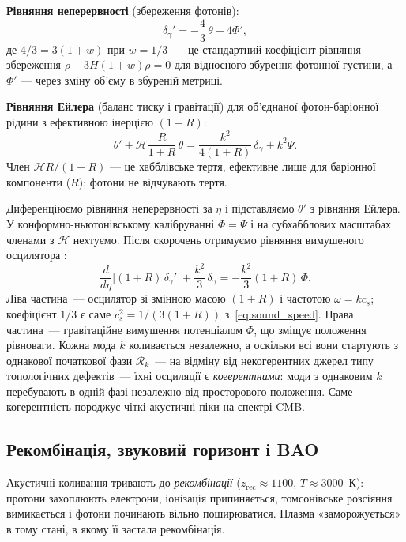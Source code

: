\documentclass[12pt, a4paper]{article}
\begin{document}
\textbf{Рівняння неперервності} (збереження фотонів):
\begin{equation*}
  \delta_\gamma' = -\frac{4}{3}\,\theta + 4\Phi',
\end{equation*}
де $4/3 = 3(1+w)$ при $w=1/3$~--- це стандартний коефіцієнт
рівняння збереження $\dot\rho + 3H(1+w)\rho = 0$ для відносного
збурення фотонної густини,
а $\Phi'$ — через зміну об'єму в збуреній метриці.

\textbf{Рівняння Ейлера} (баланс тиску і гравітації) для
об'єднаної фотон-баріонної рідини з ефективною інерцією $(1+R)$:
\begin{equation*}
  \theta' + \mathcal{H}\frac{R}{1+R}\,\theta
  = \frac{k^2}{4(1+R)}\,\delta_\gamma + k^2\Psi.
\end{equation*}
Член $\mathcal{H}R/(1+R)$ — це хабблівське тертя, ефективне
лише для баріонної компоненти ($R$); фотони не відчувають тертя.

Диференціюємо рівняння неперервності за $\eta$ і підставляємо
$\theta'$ з рівняння Ейлера. У конформно-ньютонівському
калібруванні $\Phi = \Psi$ і на субхабблових масштабах
членами з $\mathcal{H}$ нехтуємо. Після скорочень отримуємо
рівняння вимушеного осцилятора \cite{dodelson_2020}:
\begin{equation}\label{eq:acoustic_oscillator}
  \frac{d}{d\eta}\bigl[(1+R)\,\delta_\gamma'\bigr]
  + \frac{k^2}{3}\,\delta_\gamma
  = -\frac{k^2}{3}(1+R)\,\Phi.
\end{equation}
Ліва частина~--- осцилятор зі змінною масою $(1+R)$
і частотою $\omega = kc_s$; коефіцієнт $1/3$ є саме
$c_s^2 = 1/(3(1+R))$ з~\eqref{eq:sound_speed}. Права
частина~--- гравітаційне вимушення потенціалом $\Phi$,
що зміщує положення рівноваги. Кожна мода $k$ коливається
незалежно, а оскільки всі вони стартують з однакової
початкової фази $\mathcal{R}_k$~--- на відміну від
некогерентних джерел типу топологічних дефектів~--- їхні
осциляції є \emph{когерентними}: моди з однаковим $k$
перебувають в одній фазі незалежно від просторового
положення. Саме когерентність породжує чіткі акустичні
піки на спектрі CMB.

\subsection{Рекомбінація, звуковий горизонт і BAO}

Акустичні коливання тривають до \emph{рекомбінації}
($z_\mathrm{rec} \approx 1100$, $T \approx 3000$~К):
протони захоплюють електрони, іонізація припиняється,
томсонівське розсіяння вимикається і фотони починають
вільно поширюватися. Плазма «заморожується» в тому стані,
в якому її застала рекомбінація.
\end{document}
